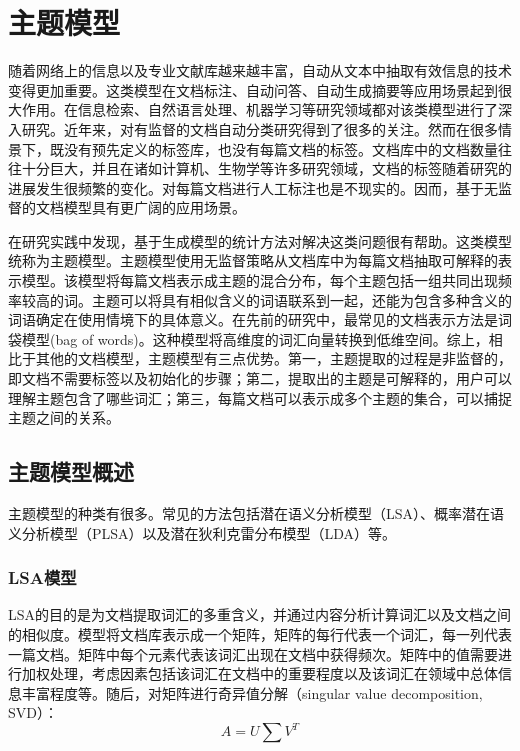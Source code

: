 \section{主题模型}

随着网络上的信息以及专业文献库越来越丰富，自动从文本中抽取有效信息的技术变得更加重要。这类模型在文档标注、自动问答、自动生成摘要等应用场景起到很大作用。在信息检索、自然语言处理、机器学习等研究领域都对该类模型进行了深入研究。近年来，对有监督的文档自动分类研究得到了很多的关注\cite{yang1999evaluation}。然而在很多情景下，既没有预先定义的标签库，也没有每篇文档的标签。文档库中的文档数量往往十分巨大，并且在诸如计算机、生物学等许多研究领域，文档的标签随着研究的进展发生很频繁的变化。对每篇文档进行人工标注也是不现实的。因而，基于无监督的文档模型具有更广阔的应用场景。

在研究实践中发现，基于生成模型\cite{zhong2005generative,hofmann1999probabilistic,blei2003latent,minka2002expectation}的统计方法对解决这类问题很有帮助。这类模型统称为主题模型。主题模型使用无监督策略从文档库中为每篇文档抽取可解释的表示模型。该模型将每篇文档表示成主题的混合分布，每个主题包括一组共同出现频率较高的词。主题可以将具有相似含义的词语联系到一起，还能为包含多种含义的词语确定在使用情境下的具体意义。在先前的研究中，最常见的文档表示方法是词袋模型(bag of words)\cite{zhang2010understanding}。这种模型将高维度的词汇向量转换到低维空间。综上，相比于其他的文档模型，主题模型有三点优势。第一，主题提取的过程是非监督的，即文档不需要标签以及初始化的步骤；第二，提取出的主题是可解释的，用户可以理解主题包含了哪些词汇；第三，每篇文档可以表示成多个主题的集合，可以捕捉主题之间的关系。


\subsection{主题模型概述}

主题模型的种类有很多。常见的方法包括潜在语义分析模型（LSA）、概率潜在语义分析模型（PLSA）以及潜在狄利克雷分布模型（LDA）等。

\subsubsection{LSA模型}
LSA\cite{deerwester1990indexing}的目的是为文档提取词汇的多重含义，并通过内容分析计算词汇以及文档之间的相似度。模型将文档库表示成一个矩阵，矩阵的每行代表一个词汇，每一列代表一篇文档。矩阵中每个元素代表该词汇出现在文档中获得频次。矩阵中的值需要进行加权处理，考虑因素包括该词汇在文档中的重要程度以及该词汇在领域中总体信息丰富程度等。随后，对矩阵进行奇异值分解（singular value decomposition, SVD）\cite{golub1970singular}：
\begin{equation}
	A = U\sum V^T
\end{equation}

